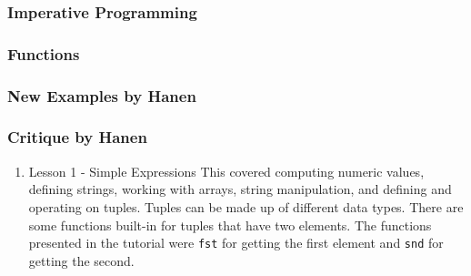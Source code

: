 \documentclass{article}
\begin{document}
\subsubsection{Imperative Programming}
\subsubsection{Functions}
\subsubsection{New Examples by Hanen}
\subsubsection{Critique by Hanen}

\begin{enumerate}
\item Lesson 1 - Simple Expressions 
  This covered computing numeric values, defining strings, working with arrays, string manipulation, and defining and operating on tuples. Tuples can be made up of different data types. There are some functions built-in for tuples that have two elements. The functions presented in the tutorial were \texttt{fst} for getting the first element and \texttt{snd} for getting the second.


\end{enumerate}
\end{document}
